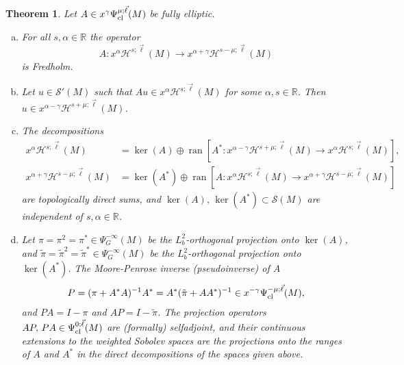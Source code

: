 \documentclass[reqno]{amsart}
\numberwithin{equation}{section}
\newtheorem{theorem}[equation]{Theorem}
\theoremstyle{definition}
\def\R{\mathbb R}
\def\S{\mathscr S}
\DeclareMathOperator{\ran}{ran}
\begin{document}
\begin{theorem}
Let $A \in x^{\gamma}\Psi_{\textup{cl}}^{\mu;\vec{\ell}}(M)$ be fully elliptic.
\begin{enumerate}[(a)]
\item For all $s,\alpha \in \R$ the operator
$$
A : x^{\alpha}{\mathscr H}^{s;\vec{\ell}}(M) \to x^{\alpha+\gamma}{\mathscr H}^{s-\mu;\vec{\ell}}(M) 
$$
is Fredholm.
\item Let $u \in \S'(M)$ such that $Au \in x^{\alpha}{\mathscr H}^{s;\vec{\ell}}(M)$ for some $\alpha,s \in \R$. Then $u \in x^{\alpha-\gamma}{\mathscr H}^{s+\mu;\vec{\ell}}(M)$.
\item The decompositions
\begin{align*}
x^{\alpha}{\mathscr H}^{s;\vec{\ell}}(M) &= \ker(A) \oplus \ran[A^* : x^{\alpha-\gamma}{\mathscr H}^{s+\mu;\vec{\ell}}(M) \to x^{\alpha}{\mathscr H}^{s;\vec{\ell}}(M)], \\
x^{\alpha+\gamma}{\mathscr H}^{s-\mu;\vec{\ell}}(M) &= \ker(A^*) \oplus \ran[A : x^{\alpha}{\mathscr H}^{s;\vec{\ell}}(M) \to x^{\alpha+\gamma}{\mathscr H}^{s-\mu;\vec{\ell}}(M)]
\end{align*}
are topologically direct sums, and $\ker(A),\,\ker(A^*) \subset \S(M)$ are independent of $s,\alpha \in \R$.
\item Let $\pi = \pi^2 =\pi^* \in \Psi^{-\infty}_G(M)$ be the $L^2_b$-orthogonal projection onto $\ker(A)$, and $\tilde{\pi} = \tilde{\pi}^2 = \tilde{\pi}^* \in \Psi^{-\infty}_G(M)$ be the $L^2_b$-orthogonal projection onto $\ker(A^*)$. The Moore-Penrose inverse (pseudoinverse) of $A$
$$
P = (\pi + A^*A)^{-1}A^* = A^*(\tilde{\pi} + AA^*)^{-1} \in x^{-\gamma}\Psi_{\textup{cl}}^{-\mu;\vec{\ell}}(M),
$$
and $PA = I - \pi$ and $AP = I - \tilde{\pi}$. The projection operators $AP,\, PA \in \Psi_{\textup{cl}}^{0;\vec{\ell}}(M)$ are (formally) selfadjoint, and their continuous extensions to the weighted Sobo\-lev spaces are the projections onto the ranges of $A$ and $A^*$ in the direct decompositions of the spaces given above.
\end{enumerate}
\end{theorem}
\end{document}
